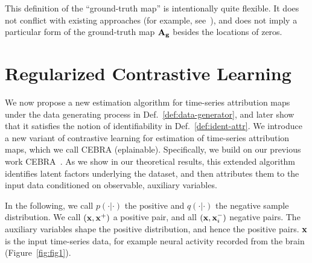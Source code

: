    This definition of the ``ground-truth map'' is intentionally quite flexible. It does not conflict with existing approaches (for example, see~\citealp{Sundararajan2017AxiomaticAF}), and does not imply a particular form of the ground-truth map $\AA_\gg$ besides the locations of zeros. 
    
\section{Regularized Contrastive Learning}
\label{sec:regcl}

    We now propose a new estimation algorithm for time-series attribution maps under the data generating process in Def.~\ref{def:data-generator}, and later show that it satisfies the notion of identifiability in Def.~\ref{def:ident-attr}.
    We introduce a new variant of contrastive learning
    for estimation of time-series attribution maps, which we call CEBRA (eplainable). Specifically, we build on our previous work CEBRA~\cite{schneider2023cebra}.
    As we show in our theoretical results, this extended algorithm identifies latent factors underlying the dataset, and then attributes them to the input data conditioned on observable, auxiliary variables.

    In the following, we call $p(\cdot | \cdot)$ the positive and $q(\cdot | \cdot)$ the negative sample distribution.
    We call $(\xx, \xx^+)$ a positive pair, and all $(\xx, \xx^-_i)$  negative pairs.
    The auxiliary variables shape the positive distribution, and hence the positive pairs.
    $\xx$ is the input time-series data, for example neural activity recorded from the brain (Figure~\ref{fig:fig1}).
  
